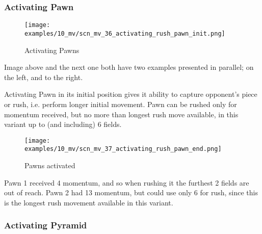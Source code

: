 \clearpage %

\subsubsection*{Activating Pawn}
\label{sec:Miranda's veil/Wave/Cascading Waves/Activating Pawn}

\vspace*{-1.4\baselineskip}
\noindent
\begin{figure}[!h]
\texttt{[image: examples/10\_mv/scn\_mv\_36\_activating\_rush\_pawn\_init.png]}
\vspace*{-1.3\baselineskip}
\caption{Activating Pawns}
\label{fig:scn_mv_36_activating_rush_pawn_init}
\end{figure}

\vspace*{-0.3\baselineskip}
Image above and the next one both have two examples presented in parallel; on the left,
and to the right.

Activating Pawn in its initial position gives it ability to capture opponent's
piece or rush, i.e. perform longer initial movement. Pawn can be rushed only for
momentum received, but no more than longest rush move available, in this variant
up to (and including) 6 fields.

\clearpage %

\vspace*{-2.1\baselineskip}
\noindent
\begin{figure}[!h]
\texttt{[image: examples/10\_mv/scn\_mv\_37\_activating\_rush\_pawn\_end.png]}
\caption{Pawns activated}
\label{fig:scn_mv_37_activating_rush_pawn_end}
\end{figure}

Pawn 1 received 4 momentum, and so when rushing it the furthest 2 fields are out
of reach. Pawn 2 had 13 momentum, but could use only 6 for rush, since this is the
longest rush movement available in this variant.

\clearpage %

\subsubsection*{Activating Pyramid}
\label{sec:Miranda's veil/Wave/Cascading Waves/Activating Pyramid}

